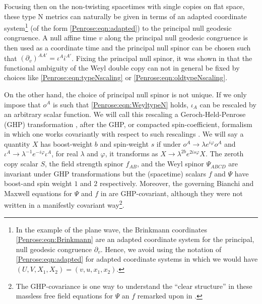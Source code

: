 Focusing then on the non-twisting spacetimes with single copies on flat space, these type N metrics can naturally
be given in terms of an adapted coordinate system\footnote{In the example of the plane wave, the Brinkmann
coordinates \eqref{Penrose:eqn:Brinkmann} are an adapted coordinate system for the principal, null geodesic congruence
$\partial_v$. Hence, we avoid using the notation of  \eqref{Penrose:eqn:adapted} for adapted coordinate systems in which we would have $(U,V,X_1,X_2) = (v,u,x_1,x_2)$.} (of the form \eqref{Penrose:eqn:adapted}) to the principal null geodesic congruence. A null affine time $v$ along the principal null geodesic congruence is then used as a coordinate time and the principal null spinor can be chosen such that $(\partial_v)^{AA'} = \iota^A \bar{\iota}^{A'}$. Fixing the principal null spinor, it was shown in \cite{Godazgar:2020zbv} that the functional ambiguity of the Weyl double copy can not in general be fixed by choices like \eqref{Penrose:eqn:typeNscaling} or \eqref{Penrose:eqn:oldtypeNscaling}. 

On the other hand, the choice of principal null spinor is not unique. If we only impose that $o^A$ is such that
\eqref{Penrose:eqn:WeyltypeN} holds, $\iota_A$ can be rescaled by an arbitrary scalar function. We will call this rescaling
a Geroch-Held-Penrose (GHP) transformation \cite{geroch1973space}, after the GHP, or compacted spin-coefficient,
formalism in which one works covariantly with respect to such rescalings \cite{Penrose:1985bww}. We will say a
quantity $X$ has boost-weight $b$ and spin-weight $s$ if under $o^A \to \lambda e^{i \varphi}o^A$ and $\iota^A \to
\lambda^{-1} e^{-i \varphi} \iota^A$, for real $\lambda$ and $\varphi$, it transforms as $X \to \lambda^{2b} e^{2 i
s \varphi}  X$. The zeroth copy scalar $S$, the field strength spinor $f_{AB}$, and the Weyl spinor $\Psi_{ABCD}$
are invariant under GHP transformations but the (spacetime) scalars $f$ and $\Psi$ have boost-and spin weight $1$
and $2$ respectively. Moreover, the governing Bianchi and Maxwell equations for $\Psi$ and $f$ in \cite{Godazgar:2020zbv} are GHP-covariant, although they were not written in a manifestly covariant way\footnote{The GHP-covariance is one way to understand the ``clear structure'' in these massless free field equations for $\Psi$ an $f$ remarked upon in \cite{Godazgar:2020zbv}.}. 

